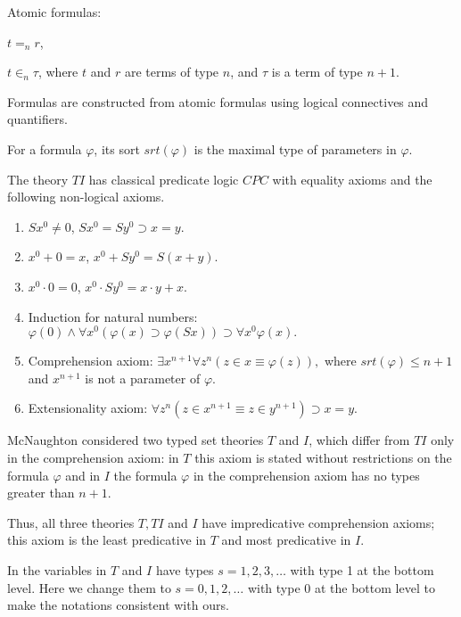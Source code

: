 \documentclass{asl}
\theoremstyle{definition}
\begin{document}
Atomic formulas:
\begin{list}{}{}
\item $ t=_nr$, 
\item $ t\in_n\tau $, where $t$ and $r$ are terms of type $n$, and $\tau$ is a term of type $n+1$.
\end{list}

Formulas are constructed from atomic formulas using logical connectives and quantifiers.

For a formula $ \varphi $, its sort $srt(\varphi)$ is the maximal type of parameters in $ \varphi $. 

The theory $TI$ has classical predicate logic $CPC$ with equality axioms and the following non-logical axioms.

\begin{enumerate}
\item $ Sx^0 \neq 0$, \qquad $Sx^0=Sy^0\supset x=y. $
\smallskip
\item $x^0+0=x$, \qquad $x^0+Sy^0=S(x+y)$.
\smallskip
\item $x^0\cdot 0=0$, \qquad $x^0\cdot Sy^0=x\cdot y+x$.
\smallskip
\item Induction for natural numbers: $ \varphi(0) \wedge \forall x^0 \left(\varphi(x)\supset \varphi(Sx)\right) \supset \forall x^0 \varphi(x).$
\medskip
\item Comprehension axiom: 
$ \exists x^{n+1} \forall z^n \left(z\in x\equiv \varphi(z) \right), $
where $srt(\varphi)\leqslant n+1$ and $x^{n+1}$ is not a parameter of $\varphi$.
\medskip
\item Extensionality axiom:
$\forall z^n \left(z\in x^{n+1}\equiv z\in y^{n+1} \right)\supset x=y.$ 
\end{enumerate}

McNaughton {\cite{mcnt53}} considered two typed set theories $T$ and $I$, which differ from $TI$ only in the comprehension axiom: in $T$ this axiom is stated without restrictions on the formula $\varphi$ and in $I$ the formula $\varphi$ in the comprehension  axiom has no types greater than $n+1$.

Thus, all three theories $T, TI$ and $I$ have impredicative comprehension axioms; this axiom is the least predicative in $T$ and most predicative in $I$.

In \cite{mcnt53} the variables in $T$ and $I$ have types $s=1,2,3,\ldots$ with type 1 at the bottom level. Here we change them to $s=0,1,2,\ldots$ with type 0 at the bottom level to make the notations consistent with ours.
\end{document}
